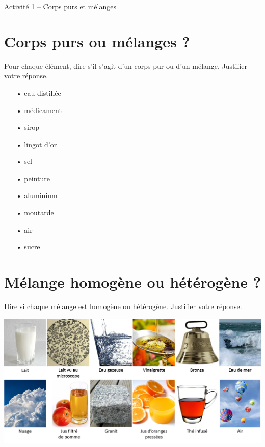 
\cfoot{} %



\begin{header}
Activité 1 -- Corps purs et mélanges
\end{header}

\section*{Corps purs ou mélanges ?}

Pour chaque élément, dire s'il s'agit d'un corps pur ou d'un mélange.
Justifier votre réponse.

\begin{multicols}{4}
\begin{itemize}
\item[•] eau distillée
\item[•] médicament
\item[•] sirop
\item[•] lingot d'or
\item[•] sel
\item[•] peinture
\item[•] aluminium
\item[•] moutarde
\item[•] air
\item[•] sucre
\end{itemize}
\end{multicols}

\section*{Mélange homogène ou hétérogène ?}

Dire si chaque mélange est homogène ou hétérogène.
Justifier votre réponse.

\begin{center}
\includegraphics[width=\textwidth]{images/melanges_hom_het.png}
\end{center}


